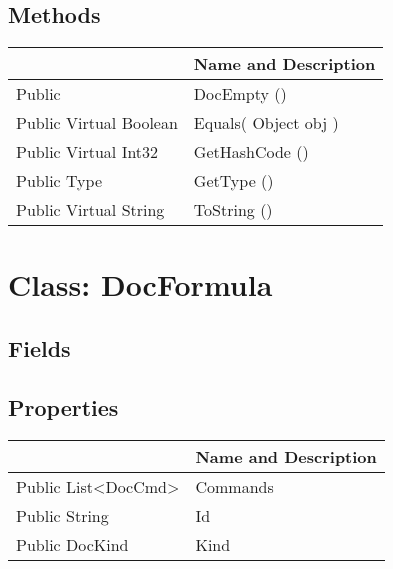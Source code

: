 \documentclass[11pt, oneside, a4paper]{book}
\begin{document}
\subsection{Methods}
\begin{center}
\begin{tabular}{| p{3cm} | p{12cm} | }
\hline
\textbf{ } & \textbf{ Name and Description}\\
\hline
 Public  &  DocEmpty ()\hypertarget{SoftwareEngineeringTools.{}Documentation.{}DocEmpty.{}DocEmpty}{}\\
\hline
 Public  Virtual  Boolean &  Equals(\hypertarget{SoftwareEngineeringTools.{}Documentation.{}DocEmpty.{}Equals\_Object}{} Object  obj  )\\
\hline
 Public  Virtual  Int32 &  GetHashCode ()\hypertarget{SoftwareEngineeringTools.{}Documentation.{}DocEmpty.{}GetHashCode}{}\\
\hline
 Public  Type &  GetType ()\hypertarget{SoftwareEngineeringTools.{}Documentation.{}DocEmpty.{}GetType}{}\\
\hline
 Public  Virtual  String &  ToString ()\hypertarget{SoftwareEngineeringTools.{}Documentation.{}DocEmpty.{}ToString}{}\\
\hline
\end{tabular}
\end{center}
 


\hypertarget{SoftwareEngineeringTools.{}Documentation.{}DocFormula}{}
\section{Class: DocFormula}

\subsection{Fields}

\subsection{Properties}
\begin{center}
\begin{tabular}{| p{3cm} | p{12cm} | }
\hline
\textbf{ } & \textbf{ Name and Description}\\
\hline
 Public  List<DocCmd> &  Commands\hypertarget{SoftwareEngineeringTools.{}Documentation.{}DocFormula.{}Commands}{}\\
\hline
 Public  String &  Id\hypertarget{SoftwareEngineeringTools.{}Documentation.{}DocFormula.{}Id}{}\\
\hline
 Public  DocKind &  Kind\hypertarget{SoftwareEngineeringTools.{}Documentation.{}DocFormula.{}Kind}{}\\
\hline
\end{tabular}
\end{center}
\end{document}
